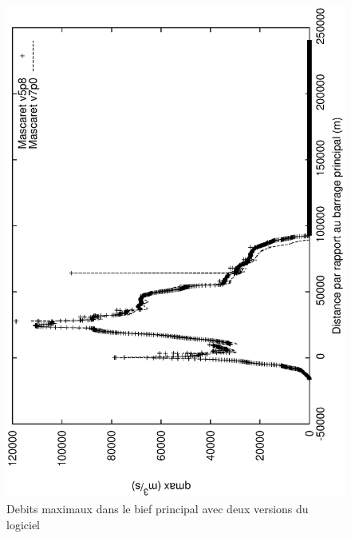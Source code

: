 \documentclass[a4paper,10pt]{article}
\begin{document}
\begin{figure}
 \begin{center}
  \includegraphics[angle=270,width=15cm]{debit_max.eps}
  \caption{Debits maximaux dans le bief principal avec deux versions du logiciel}
  \label{fig5}
 \end{center}
\end{figure}
\end{document}
